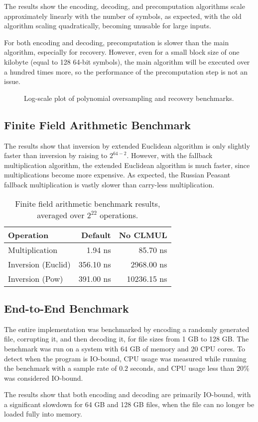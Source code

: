The results show the encoding, decoding, and precomputation algorithms scale approximately linearly with the number of symbols, as expected, with the old algorithm scaling quadratically, becoming unusable for large inputs.

For both encoding and decoding, precomputation is slower than the main algorithm, especially for recovery.
However, even for a small block size of one kilobyte (equal to 128 64-bit symbols), the main algorithm will be executed over a hundred times more, so the performance of the precomputation step is not an issue.

\begin{figure}[!hbt]
\begin{center}

\end{center}
\caption{Log-scale plot of polynomial oversampling and recovery benchmarks.}
\end{figure}

\subsection{Finite Field Arithmetic Benchmark}

The results show that inversion by extended Euclidean algorithm is only slightly faster than inversion by raising to $2^{64 - 2}$.
However, with the fallback multiplication algorithm, the extended Euclidean algorithm is much faster, since multiplications become more expensive.
As expected, the Russian Peasant fallback multiplication is vastly slower than carry-less multiplication.

\begin{table}[hbt]
\centering
\caption{Finite field arithmetic benchmark results, averaged over $2^{22}$ operations.}
\begin{tabular}{lrr}
\toprule
\textbf{Operation} & \textbf{Default} & \textbf{No CLMUL} \\
\midrule
Multiplication     & 1.94 ns   & 85.70 ns   \\
Inversion (Euclid) & 356.10 ns & 2968.00 ns \\
Inversion (Pow)    & 391.00 ns & 10236.15 ns \\
\bottomrule
\end{tabular}
\end{table}

\subsection{End-to-End Benchmark}

The entire implementation was benchmarked by encoding a randomly generated file, corrupting it, and then decoding it, for file sizes from 1 GB to 128 GB.
The benchmark was run on a system with 64 GB of memory and 20 CPU cores.
To detect when the program is IO-bound, CPU usage was measured while running the benchmark with a sample rate of $0.2$ seconds, and CPU usage less than $20\%$ was considered IO-bound.

The results show that both encoding and decoding are primarily IO-bound, with a significant slowdown for 64 GB and 128 GB files, when the file can no longer be loaded fully into memory.

